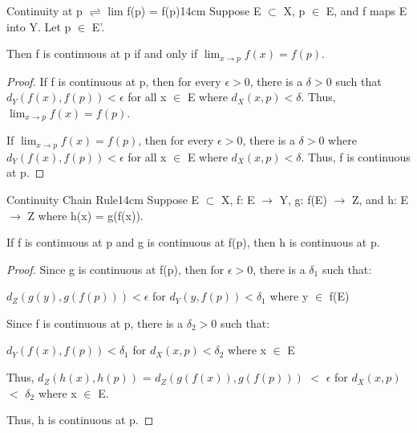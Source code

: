     \begin{wtheorem}{Continuity at p $\rightleftharpoons$ lim f(p) = f(p)}{14cm}
        Suppose E $\subset$ X, p $\in$ E, and
        f maps E into Y. Let p $\in$ E'.

        Then f is continuous at p if and only if
        $\lim_{x \rightarrow p} f(x) = f(p)$.
    \end{wtheorem}

    \begin{proof}
        If f is continuous at p, then for every $\epsilon > 0$, there
        is a $\delta > 0$ such that $d_Y(f(x),f(p)) < \epsilon$
        for all x $\in$ E where $d_X(x,p) < \delta$.
        Thus, $\lim_{x \rightarrow p} f(x) = f(p)$.

        \vspace{0.2cm}

        If $\lim_{x \rightarrow p} f(x) = f(p)$, then for every
        $\epsilon > 0$, there is a $\delta > 0$ where $d_Y(f(x),f(p)) < \epsilon$
        for all x $\in$ E where $d_X(x,p) < \delta$.
        Thus, f is continuous at p.
    \end{proof}

    \vspace{0.5cm}



    \begin{wtheorem}{Continuity Chain Rule}{14cm}
        Suppose E $\subset$ X, f: E $\rightarrow$ Y, g: f(E) $\rightarrow$ Z,
        and h: E $\rightarrow$ Z where h(x) = g(f(x)).

        If f is continuous at p and g is continuous at f(p),
        then h is continuous at p.
    \end{wtheorem}

    \begin{proof}
        Since g is continuous at f(p), then for $\epsilon > 0$, there is a
        $\delta_1$ such that:

        \hspace{1cm}
        $d_Z(g(y),g(f(p))) < \epsilon$ for $d_Y(y,f(p)) < \delta_1$
        where y $\in$ f(E)

        Since f is continuous at p, there is a $\delta_2 > 0$ such that:

        \hspace{1cm}
        $d_Y(f(x),f(p)) < \delta_1$ for $d_X(x,p) < \delta_2$ 
        where x $\in$ E

        Thus, $d_Z(h(x),h(p))$ = $d_Z(g(f(x)),g(f(p)))$ $<$ $\epsilon$
        for $d_X(x,p)$ $<$ $\delta_2$ where x $\in$ E.

        Thus, h is continuous at p.
    \end{proof}




